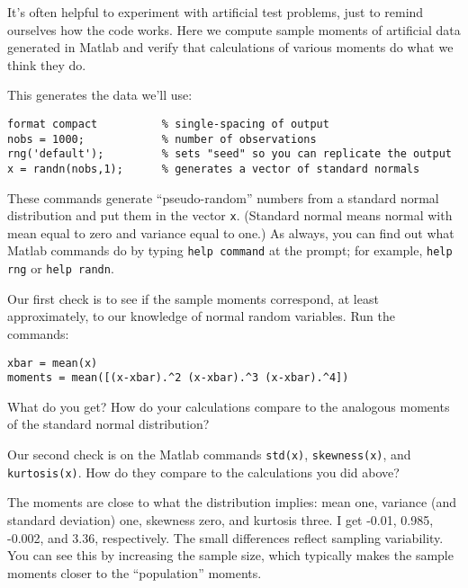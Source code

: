 \documentclass[11pt]{exam}
\begin{document}
\begin{questions}
It's often helpful to experiment with artificial test problems,
just to remind ourselves how the code works.
Here we compute sample moments of artificial data generated in Matlab
and verify that calculations of various moments do what we think they do.

This generates the data we'll use:
\begin{verbatim}
format compact          % single-spacing of output
nobs = 1000;            % number of observations
rng('default');         % sets "seed" so you can replicate the output
x = randn(nobs,1);      % generates a vector of standard normals
\end{verbatim}
These commands generate ``pseudo-random'' numbers from a
standard normal distribution and put them in the vector {\tt x}.
(Standard normal means normal with mean equal to zero and variance equal to one.)
As always, you can find out what Matlab commands do by typing
{\tt help command} at the prompt;
for example, {\tt help rng} or {\tt help randn}.

\begin{parts}
\item Our first check is to see if the sample moments
correspond, at least approximately,
to our knowledge of normal random variables.
Run the commands:
\begin{verbatim}
xbar = mean(x)
moments = mean([(x-xbar).^2 (x-xbar).^3 (x-xbar).^4])
\end{verbatim}
What do you get?
How do your calculations compare to the analogous moments of the standard normal distribution?

\item Our second check is on the Matlab commands
{\tt std(x)}, {\tt skewness(x)}, and {\tt kurtosis(x)}.
How do they compare to the calculations you did above?
\end{parts}

\begin{solution}
\begin{parts}
\item The moments are close to what the distribution implies:
mean one, variance (and standard deviation) one,
skewness zero, and kurtosis three.
I get -0.01, 0.985, -0.002, and 3.36, respectively.
The small differences reflect sampling variability.
You can see this by increasing the sample size,
which typically makes the sample moments closer
to the ``population'' moments.


\end{parts}
\end{solution}
\end{questions}
\end{document}
